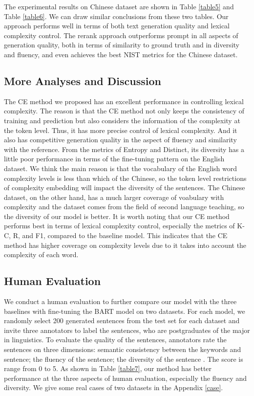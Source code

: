 \documentclass[11pt]{article}
\begin{document}
The experimental results on Chinese dataset are shown in Table \ref{table5} and Table \ref{table6}. We can draw similar conclusions from these two tables. Our approach performs well in terms of both text generation quality and lexical complexity control. The rerank approach outperforms prompt in all aspects of generation quality, both in terms of similarity to ground truth and in diversity and fluency, and even achieves the best NIST metrics for the Chinese dataset.

\subsection{More Analyses and Discussion}
The CE method we proposed has an excellent performance in controlling lexical complexity. The reason is that the CE method not only keeps the consistency of training and prediction but also considers the information of the complexity at the token level. Thus, it has more precise control of lexical complexity. And it also has competitive generation quality in the aspect of fluency and similarity with the reference. From the metrics of Entropy and Distinct, its diversity has a little poor performance in terms of the fine-tuning pattern on the English dataset.  We think the main reason is that the vocabulary of the English word complexity levels is less than which of the Chinese, so the token level restrictions of complexity embedding will impact the diversity of the sentences. The Chinese dataset, on the other hand, has a much larger coverage of voabulary with complexity and the dataset comes from the field of second language teaching, so the diversity of our model is better. It is worth noting that our CE method performs best in terms of lexical complexity control, especially the metrics of K-C, R, and F1, compared to the baseline model. This indicates that the CE method has higher coverage on complexity levels due to it takes into account the complexity of each word.


\subsection{Human Evaluation}
We conduct a human evaluation to further compare our model with the three baselines with fine-tuning the BART model on two datasets. For each model, we randomly select 200 generated sentences from the test set for each dataset and invite three annotators to label the sentences, who are postgraduates of the major in linguistics. To evaluate the quality of the sentences, annotators rate the sentences on three dimensions:  semantic consistency between the keywords and sentence; the fluency of the sentence; the diversity of the sentence \cite{zhang2020pointer}.  The score is range from 0 to 5. As shown in Table \ref{table7}, our method has better performance at the three aspects of human evaluation, especially the fluency and diversity. We give some real cases of two datasets in the Appendix \ref{case}.
\end{document}
